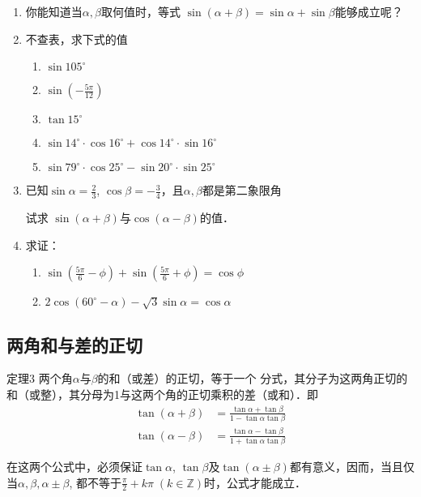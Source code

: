 \begin{ex}
\begin{enumerate}
    \item 你能知道当$\alpha,\beta$取何值时，等式
    $\sin(\alpha+\beta)=\sin\alpha+\sin\beta$能够成立呢？
\item 不查表，求下式的值
\begin{enumerate}
    \item $\sin 105^{\circ}$
    \item $\sin\left(-\frac{5\pi}{12}\right)$
    \item $\tan 15^{\circ}$
    \item $\sin 14^{\circ}\cdot \cos 16^{\circ}+\cos 14^{\circ}\cdot \sin 16^{\circ}$
    \item $\sin 79^{\circ}\cdot \cos 25^{\circ}-\sin 20^{\circ}\cdot \sin 25^{\circ}$
\end{enumerate}
\item 已知$\sin\alpha=\frac{2}{3}$, $\cos\beta=-\frac{3}{4}$，且$\alpha,\beta$都是第二象限角

试求
$\sin(\alpha+\beta)$与$\cos(\alpha-\beta)$的值．
\item 求证：
\begin{enumerate}
    \item $\sin\left(\frac{5\pi}{6}-\phi\right)+\sin\left(\frac{5\pi}{6}+\phi\right)=\cos\phi$
    \item $2\cos(60^{\circ}-\alpha)-\sqrt{3}\sin\alpha=\cos\alpha$
\end{enumerate}
\end{enumerate}
\end{ex}

\subsection{两角和与差的正切}
\begin{blk}{定理3}
    两个角$\alpha$与$\beta$的和（或差）的正切，等于一个
分式，其分子为这两角正切的和（或整），其分母为1与这两个角的正切乘积的差（或和）．即
\begin{align}
    \tan(\alpha+\beta)&=\frac{\tan\alpha+\tan\beta}{1-\tan\alpha\tan\beta}\\
    \tan(\alpha-\beta)&=\frac{\tan\alpha-\tan\beta}{1+\tan\alpha\tan\beta}
\end{align}
\end{blk}

\begin{rmk}
    在这两个公式中，必须保证$\tan\alpha$, $\tan\beta$及$\tan(\alpha\pm\beta)$都有意义，因而，当且仅当$\alpha,\beta,\alpha\pm\beta$, 都不等于$\frac{\pi}{2}+k\pi\; (k\in\mathbb{Z})$时，公式才能成立．
\end{rmk}

